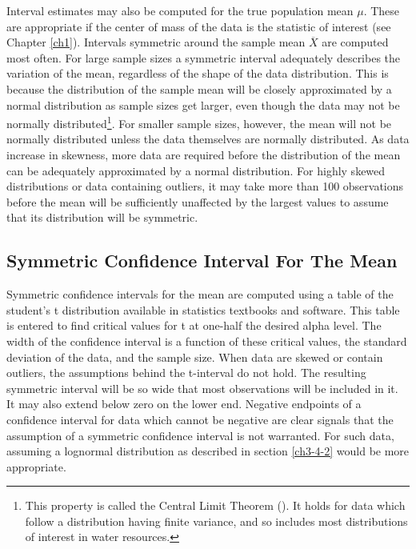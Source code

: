 \documentclass[]{book}
\begin{document}
Interval estimates may also be computed for the true population mean \(\mu\). These are appropriate if the center of mass of the data is the statistic of interest (see Chapter \ref{ch1}). Intervals symmetric around the sample mean \(\overline{X}\) are computed most often. For large sample sizes a symmetric interval adequately describes the variation of the mean, regardless of the shape of the data distribution. This is because the distribution of the sample mean will be closely approximated by a normal distribution as sample sizes get larger, even though the data may not be normally distributed\footnote{This property is called the Central Limit Theorem (\citet{conover_practical_1980}). It holds for data which follow a distribution having finite variance, and so includes most distributions of interest in water resources.}. For smaller sample sizes, however, the mean will not be normally distributed unless the data themselves are normally distributed. As data increase in skewness, more data are required before the distribution of the mean can be adequately approximated by a normal distribution. For highly skewed distributions or data containing outliers, it may take more than 100 observations before the mean will be sufficiently unaffected by the largest values to assume that its distribution will be symmetric.

\hypertarget{ch3-4-1}{%
\subsection{Symmetric Confidence Interval For The Mean}\label{ch3-4-1}}

Symmetric confidence intervals for the mean are computed using a table of the student's t distribution available in statistics textbooks and software. This table is entered to find critical values for t at one-half the desired alpha level. The width of the confidence interval is a function of these critical values, the standard deviation of the data, and the sample size. When data are skewed or contain outliers, the assumptions behind the t-interval do not hold. The resulting symmetric interval will be so wide that most observations will be included in it. It may also extend below zero on the lower end. Negative endpoints of a confidence interval for data which cannot be negative are clear signals that the assumption of a symmetric confidence interval is not warranted. For such data, assuming a lognormal distribution as described in section \ref{ch3-4-2} would be more appropriate.
\end{document}
